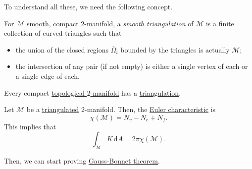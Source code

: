 To understand all these, we need the following concept.

\begin{definition}\label{def:smooth-triangulation}
	For \(\mathcal{M} \) smooth, compact \(2\)-manifold, a \emph{smooth triangulation} of \(\mathcal{M} \) is a finite collection of curved triangles such that
	\begin{itemize}
		\item the union of the closed regions \(\overline{\Omega} _i\) bounded by the triangles is actually \(\mathcal{M} \);
		\item the intersection of any pair (if not empty) is either a single vertex of each or a single edge of each.
	\end{itemize}
\end{definition}

\begin{theorem}
	Every compact \hyperref[def:topological-manifold]{topological \(2\)-manifold} has a \hyperref[def:smooth-triangulation]{triangulation}.
\end{theorem}

\begin{note}
	Let \(\mathcal{M} \) be a \hyperref[def:smooth-triangulation]{triangulated} \(2\)-manifold. Then, the \hyperref[def:Euler-characteristic]{Euler characteristic} is
	\[
		\chi (\mathcal{M} ) = N_v - N_e + N_f.
	\]
	This implies that
	\[
		\int _\mathcal{M} K \,\mathrm{d} A = 2 \pi \chi (\mathcal{M} ).
	\]
\end{note}

Then, we can start proving \hyperref[thm:Gauss-Bonnet]{Gauss-Bonnet theorem}.

